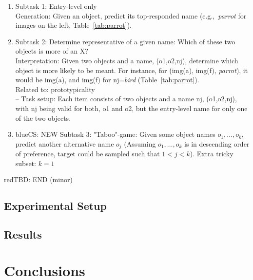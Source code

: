 \documentclass[11pt,a4paper]{article}
\newcommand{\name}[1]{\textsl{#1}\xspace}
\newcommand{\cs}[1]{\begin{color}{blue}CS: #1\end{color}\xspace}
\newcommand{\tbd}[1]{\begin{color}{red}TBD: #1\end{color}\xspace}
\begin{document}
\begin{enumerate}
\begin{enumerate}
		-- ... ?
	\end{enumerate}
	\item Subtask 1: Entry-level only\\
	Generation: Given an object, predict its top-responded name (e.g.,~\name{parrot} for images on the left, Table~\ref{tab:parrot}).
	\item Subtask 2: Determine representative of a given name: Which of these two objects is more of an X?\\	
	Interpretation: Given two objects and a name, (o1,o2,nj), determine which object is more likely to be meant. For instance, for (img(a), img(f), \name{parrot}), it would be img(a), and img(f) for nj=\name{bird} (Table~\ref{tab:parrot}).\\
	Related to: prototypicality\\
	-- Task setup:
	Each item consists of two objects and a name nj, (o1,o2,nj), with nj being valid for both, o1 and o2, but the entry-level name for only one of the two objects. 
	\item \cs{NEW Subtask 3: "Taboo"-game: Given some object names $o_1, \dots, o_k$, predict another alternative name $o_j$ (Assuming $o_1, \dots, o_k$ is in descending order of preference, target could be sampled such that $1<j<k$).  Extra tricky subset: $k=1$}
\end{enumerate}
\tbd{END (minor)}


\subsection{Experimental Setup}
\label{ssec:exp_setup}

\subsection{Results}
\label{ssec:exp_results}

\section{Conclusions}
\label{sec:conclusions}
\end{document}
